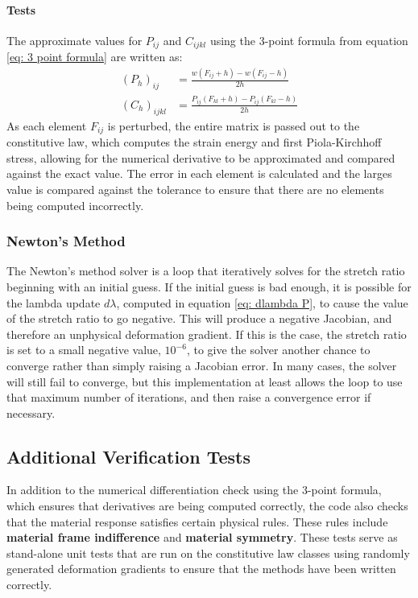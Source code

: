 \documentclass[]{spie}  %
\begin{document}
\paragraph{Tests}
The approximate values for $P_{ij}$ and $C_{ijkl}$ using the 3-point formula from equation \ref{eq: 3 point formula} are written as:
\begin{align}
(P_h)_{ij} &= \frac{w(F_{ij} + h) - w(F_{ij} - h)}{2h} \\[1ex]
(C_h)_{ijkl} &= \frac{P_{ij}(F_{kl} + h) - P_{ij}(F_{kl} - h)}{2h}
\end{align}
As each element $F_{ij}$ is perturbed, the entire matrix is passed out to the constitutive law, which computes the strain energy and first Piola-Kirchhoff stress, allowing for the numerical derivative to be approximated and compared against the exact value. The error in each element is calculated and the larges value is compared against the tolerance to ensure that there are no elements being computed incorrectly. 

\subsubsection{Newton's Method}
The Newton's method solver is a loop that iteratively solves for the stretch ratio beginning with an initial guess. If the initial guess is bad enough, it is possible for the lambda update $d\lambda$, computed in equation \ref{eq: dlambda P}, to cause the value of the stretch ratio to go negative. This will produce a negative Jacobian, and therefore an unphysical deformation gradient. If this is the case, the stretch ratio is set to a small negative value, $10^{-6}$, to give the solver another chance to converge rather than simply raising a Jacobian error. In many cases, the solver will still fail to converge, but this implementation at least allows the loop to use that maximum number of iterations, and then raise a convergence error if necessary. 

\subsection{Additional Verification Tests}
\label{sec: verification tests}
In addition to the numerical differentiation check using the 3-point formula, which ensures that derivatives are being computed correctly, the code also checks that the material response satisfies certain physical rules. These rules include \textbf{material frame indifference} and \textbf{material symmetry}. These tests serve as stand-alone unit tests that are run on the constitutive law classes using randomly generated deformation gradients to ensure that the methods have been written correctly. 
\end{document}
